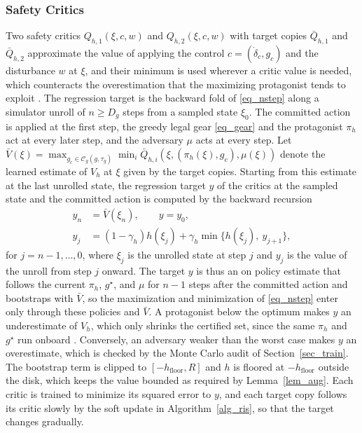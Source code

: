 \documentclass[lettersize,journal]{IEEEtran}
\newcommand{\calC}{\mathcal{C}}
\begin{document}
\subsubsection{Safety Critics}
Two safety critics $Q_{h,1}(\xi, c, w)$ and $Q_{h,2}(\xi, c, w)$ with target copies $\bar{Q}_{h,1}$ and $\bar{Q}_{h,2}$ approximate the value of applying the control $c = (\dot{\delta}_c, g_c)$ and the disturbance $w$ at $\xi$, and their minimum is used wherever a critic value is needed, which counteracts the overestimation that the maximizing protagonist tends to exploit \cite{fujimoto2018td3}. The regression target is the backward fold of \eqref{eq_nstep} along a simulator unroll of $n \ge D_g$ steps from a sampled state $\xi_0$. The committed action is applied at the first step, the greedy legal gear \eqref{eq_gear} and the protagonist $\pi_h$ act at every later step, and the adversary $\mu$ acts at every step. Let $\bar V(\xi) = \max_{g_c \in \calC_g(g, \tau_g)} \min_i \bar{Q}_{h,i}(\xi, (\pi_h(\xi), g_c), \mu(\xi))$ denote the learned estimate of $V_h$ at $\xi$ given by the target copies. Starting from this estimate at the last unrolled state, the regression target $y$ of the critics at the sampled state and the committed action is computed by the backward recursion
\begin{equation}
\begin{aligned}
y_n &= \bar V(\xi_n), \qquad y = y_0, \\
y_j &= (1-\gamma_h) h(\xi_j) + \gamma_h \min\{ h(\xi_j),\ y_{j+1} \},
\end{aligned}
\label{eq_target}
\end{equation}
for $j = n-1, \ldots, 0$, where $\xi_j$ is the unrolled state at step $j$ and $y_j$ is the value of the unroll from step $j$ onward. The target $y$ is thus an on policy estimate that follows the current $\pi_h$, $g^\star$, and $\mu$ for $n-1$ steps after the committed action and bootstraps with $\bar V$, so the maximization and minimization of \eqref{eq_nstep} enter only through these policies and $\bar V$. A protagonist below the optimum makes $y$ an underestimate of $V_h$, which only shrinks the certified set, since the same $\pi_h$ and $g^\star$ run onboard \cite{fisac2019}. Conversely, an adversary weaker than the worst case makes $y$ an overestimate, which is checked by the Monte Carlo audit of Section~\ref{sec_train}. The bootstrap term is clipped to $[-h_{\mathrm{floor}}, R]$ and $h$ is floored at $-h_{\mathrm{floor}}$ outside the disk, which keeps the value bounded as required by Lemma~\ref{lem_aug}. Each critic is trained to minimize its squared error to $y$, and each target copy follows its critic slowly by the soft update in Algorithm~\ref{alg_ris}, so that the target changes gradually.
\end{document}
